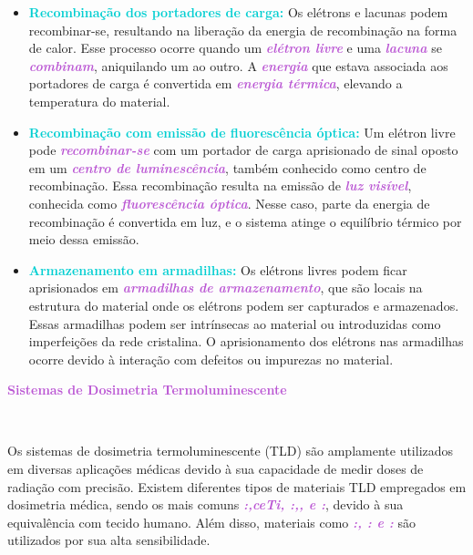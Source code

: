 \documentclass[11pt,a4paper]{article}
\begin{document}
	\begin{itemize}
		\item \textcolor{DarkTurquoise}{\textbf{Recombinação dos portadores de carga:}} Os elétrons e lacunas podem recombinar-se, resultando na liberação da energia de recombinação na forma de calor. Esse processo ocorre quando um \textcolor{MediumOrchid}{\textit{\textbf{elétron livre}}} e uma \textcolor{MediumOrchid}{\textit{\textbf{lacuna}}} se \textcolor{MediumOrchid}{\textit{\textbf{combinam}}}, aniquilando um ao outro. A \textcolor{MediumOrchid}{\textit{\textbf{energia}}} que estava associada aos portadores de carga é convertida em \textcolor{MediumOrchid}{\textit{\textbf{energia térmica}}}, elevando a temperatura do material.

		\item \textcolor{DarkTurquoise}{\textbf{Recombinação com emissão de fluorescência óptica:}} Um elétron livre pode \textcolor{MediumOrchid}{\textit{\textbf{recombinar-se}}} com um portador de carga aprisionado de sinal oposto em um \textcolor{MediumOrchid}{\textit{\textbf{centro de luminescência}}}, também conhecido como centro de recombinação. Essa recombinação resulta na emissão de \textcolor{MediumOrchid}{\textit{\textbf{luz visível}}}, conhecida como \textcolor{MediumOrchid}{\textit{\textbf{fluorescência óptica}}}. Nesse caso, parte da energia de recombinação é convertida em luz, e o sistema atinge o equilíbrio térmico por meio dessa emissão.

		\item \textcolor{DarkTurquoise}{\textbf{Armazenamento em armadilhas:}} Os elétrons livres podem ficar aprisionados em \textcolor{MediumOrchid}{\textit{\textbf{armadilhas de armazenamento}}}, que são locais na estrutura do material onde os elétrons podem ser capturados e armazenados. Essas armadilhas podem ser intrínsecas ao material ou introduzidas como imperfeições da rede cristalina. O aprisionamento dos elétrons nas armadilhas ocorre devido à interação com defeitos ou impurezas no material.
	\end{itemize}

	\noindent \textcolor{MediumOrchid}{\Large\LobsterTwo\textbf{Sistemas de Dosimetria Termoluminescente}}

	\

	Os sistemas de dosimetria termoluminescente (TLD) são amplamente utilizados em diversas aplicações médicas devido à sua capacidade de medir doses de radiação com precisão. Existem diferentes tipos de materiais TLD empregados em dosimetria médica, sendo os mais comuns \textcolor{MediumOrchid}{\textit{\textbf{:,ce{Ti}, :,, e :}}}, devido à sua equivalência com tecido humano. Além disso, materiais como \textcolor{MediumOrchid}{\textit{\textbf{:, : e :}}} são utilizados por sua alta sensibilidade.
\end{document}
